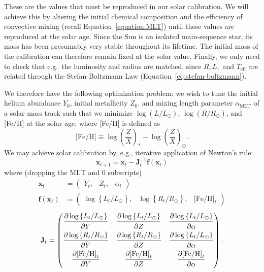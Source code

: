These are the values that must be reproduced in our solar calibration. 
We will achieve this by altering the initial chemical composition and the efficiency of convective mixing (recall Equation~\ref{equation:MLT}) until these values are reproduced at the solar age. 
Since the Sun is an isolated main-sequence star, its mass has been presumably very stable throughout its lifetime. 
The initial mass of the calibration can therefore remain fixed at the solar value. 
Finally, we only need to check that e.g.~the luminosity and radius are matched, since $R, L,$ and $T_{\text{eff}}$ are related through the Stefan-Boltzmann Law (Equation~\ref{eq:stefan-boltzmann}).

We therefore have the following optimization problem: 
we wish to tune the initial helium abundance $Y_0$, initial metallicity $Z_0$, and mixing length parameter $\alpha_{\text{MLT}}$ of a solar-mass track such that we minimize ${\log\left(L/L_\odot\right)}$,  ${\log\left(R/R_\odot\right)}$, and [Fe/H] at the solar age, where [Fe/H] is defined as
\begin{equation}
    \text{[Fe/H]}
    \equiv
    \log\left( \frac{Z}{X} \right)_\ast
    -
    \log\left( \frac{Z}{X} \right)_\odot.
\end{equation}
We may achieve solar calibration by, e.g., iterative application of Newton's rule: 
\begin{equation}
    \mathbf{x}_{t+1}
    =
    \mathbf{x}_t - \mathbf{J}_t^{-1} \mathbf{f}(\mathbf{x}_t)
\end{equation}
where (dropping the $\text{MLT}$ and $0$ subscripts)
\begin{align}
    \mathbf{x}_t
    &=
    \begin{pmatrix} Y_t , & Z_t , & \alpha_t \end{pmatrix}
    \\
    \mathbf{f}(\mathbf{x}_t)
    &=
    \begin{pmatrix} 
        \log \left\{ L_t/L_\odot \right\}, &
        \log \left\{ R_t/R_\odot \right\}, &
        \text{[Fe/H]}_t
    \end{pmatrix}
\end{align}
\begin{equation}
    \mathbf{J}_t
    =
    \begin{pmatrix} 
        \dfrac{\strut\partial \log \left\{ L_t/L_\odot \right\}}{\strut\partial Y} &
        \dfrac{\strut\partial \log \left\{ L_t/L_\odot \right\}}{\strut\partial Z} &
        \dfrac{\strut\partial \log \left\{ L_t/L_\odot \right\}}{\strut\partial \alpha}\\
        \dfrac{\strut\partial \log \left\{ R_t/R_\odot \right\}}{\strut\partial Y} &
        \dfrac{\strut\partial \log \left\{ R_t/R_\odot \right\}}{\strut\partial Z} &
        \dfrac{\strut\partial \log \left\{ L_t/L_\odot \right\}}{\strut\partial \alpha}\\
        \dfrac{\strut\partial \text{[Fe/H]}_t}{\strut\partial Y} &
        \dfrac{\strut\partial \text{[Fe/H]}_t}{\strut\partial Z} &
        \dfrac{\strut\partial \text{[Fe/H]}_t}{\strut\partial \alpha}
    \end{pmatrix}.
\end{equation}
